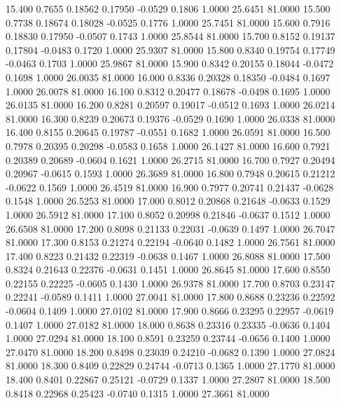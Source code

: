   15.400   0.7655   0.18562   0.17950  -0.0529   0.1806   1.0000  25.6451  81.0000
  15.500   0.7738   0.18674   0.18028  -0.0525   0.1776   1.0000  25.7451  81.0000
  15.600   0.7916   0.18830   0.17950  -0.0507   0.1743   1.0000  25.8544  81.0000
  15.700   0.8152   0.19137   0.17804  -0.0483   0.1720   1.0000  25.9307  81.0000
  15.800   0.8340   0.19754   0.17749  -0.0463   0.1703   1.0000  25.9867  81.0000
  15.900   0.8342   0.20155   0.18044  -0.0472   0.1698   1.0000  26.0035  81.0000
  16.000   0.8336   0.20328   0.18350  -0.0484   0.1697   1.0000  26.0078  81.0000
  16.100   0.8312   0.20477   0.18678  -0.0498   0.1695   1.0000  26.0135  81.0000
  16.200   0.8281   0.20597   0.19017  -0.0512   0.1693   1.0000  26.0214  81.0000
  16.300   0.8239   0.20673   0.19376  -0.0529   0.1690   1.0000  26.0338  81.0000
  16.400   0.8155   0.20645   0.19787  -0.0551   0.1682   1.0000  26.0591  81.0000
  16.500   0.7978   0.20395   0.20298  -0.0583   0.1658   1.0000  26.1427  81.0000
  16.600   0.7921   0.20389   0.20689  -0.0604   0.1621   1.0000  26.2715  81.0000
  16.700   0.7927   0.20494   0.20967  -0.0615   0.1593   1.0000  26.3689  81.0000
  16.800   0.7948   0.20615   0.21212  -0.0622   0.1569   1.0000  26.4519  81.0000
  16.900   0.7977   0.20741   0.21437  -0.0628   0.1548   1.0000  26.5253  81.0000
  17.000   0.8012   0.20868   0.21648  -0.0633   0.1529   1.0000  26.5912  81.0000
  17.100   0.8052   0.20998   0.21846  -0.0637   0.1512   1.0000  26.6508  81.0000
  17.200   0.8098   0.21133   0.22031  -0.0639   0.1497   1.0000  26.7047  81.0000
  17.300   0.8153   0.21274   0.22194  -0.0640   0.1482   1.0000  26.7561  81.0000
  17.400   0.8223   0.21432   0.22319  -0.0638   0.1467   1.0000  26.8088  81.0000
  17.500   0.8324   0.21643   0.22376  -0.0631   0.1451   1.0000  26.8645  81.0000
  17.600   0.8550   0.22155   0.22225  -0.0605   0.1430   1.0000  26.9378  81.0000
  17.700   0.8703   0.23147   0.22241  -0.0589   0.1411   1.0000  27.0041  81.0000
  17.800   0.8688   0.23236   0.22592  -0.0604   0.1409   1.0000  27.0102  81.0000
  17.900   0.8666   0.23295   0.22957  -0.0619   0.1407   1.0000  27.0182  81.0000
  18.000   0.8638   0.23316   0.23335  -0.0636   0.1404   1.0000  27.0294  81.0000
  18.100   0.8591   0.23259   0.23744  -0.0656   0.1400   1.0000  27.0470  81.0000
  18.200   0.8498   0.23039   0.24210  -0.0682   0.1390   1.0000  27.0824  81.0000
  18.300   0.8409   0.22829   0.24744  -0.0713   0.1365   1.0000  27.1770  81.0000
  18.400   0.8401   0.22867   0.25121  -0.0729   0.1337   1.0000  27.2807  81.0000
  18.500   0.8418   0.22968   0.25423  -0.0740   0.1315   1.0000  27.3661  81.0000
